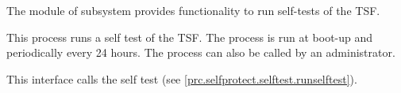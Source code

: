 



The module  of subsystem 
provides functionality to run self-tests of the TSF.



This process runs a self test of the TSF. The process is run at boot-up and
periodically every 24 hours. The process can also be called by an administrator.




This interface calls the self test (see
\autoref{prc.selfprotect.selftest.runselftest}).






